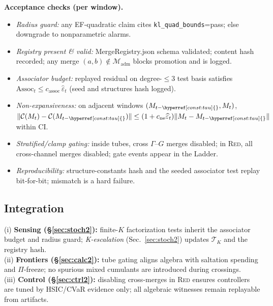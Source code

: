 \documentclass[10pt]{article}
\newcommand{\constref}[1]{\hyperref[const:#1]{\ensuremath{\csname constsym#1\endcsname}}}
\begin{document}
\begin{mdframed}
\textbf{Acceptance checks (per window).}
\begin{itemize}[leftmargin=*]
\item \emph{Radius guard:} any EF-quadratic claim cites \texttt{kl\_quad\_bounds}=\textsf{pass}; else downgrade to nonparametric alarms.
\item \emph{Registry present \& valid:} \textsf{MergeRegistry.json} schema validated; content hash recorded; any merge $(a,b)\notin\mathcal M_{\mathrm{adm}}$ blocks promotion and is logged.
\item \emph{Associator budget:} replayed residual on degree-$\le3$ test basis satisfies
$\mathrm{Assoc}_t \le c_{\mathrm{assoc}}\,\widehat\varepsilon_t$ (seed and structures hash logged).
\item \emph{Non-expansiveness:} on adjacent windows $(M_{t-\constref{tau}},M_t)$,
$\|\mathcal C(M_t)-\mathcal C(M_{t-\constref{tau}})\|\le (1+c_{\mathrm{ne}}\widehat\varepsilon_t)\|M_t-M_{t-\constref{tau}}\|$ within CI.
\item \emph{Stratified/clamp gating:} inside tubes, cross $\Gamma$–$G$ merges disabled; in \textsc{Red}, all cross-channel merges disabled; gate events appear in the Ladder.
\item \emph{Reproducibility:} structure-constants hash and the seeded associator test replay bit-for-bit; mismatch is a hard failure.
\end{itemize}
\end{mdframed}

\subsection*{Integration}
\noindent
(i) \textbf{Sensing (\S\ref{sec:stoch2}):} finite-$K$ factorization tests inherit the associator budget and radius guard; \emph{K-escalation} (Sec.~\ref{sec:stoch2}) updates $\mathcal T_K$ and the registry hash.\\
(ii) \textbf{Frontiers (\S\ref{sec:calc2}):} tube gating aligns algebra with saltation spending and $\Pi$-freeze; no spurious mixed cumulants are introduced during crossings.\\
(iii) \textbf{Control (\S\ref{sec:ctrl2}):} disabling cross-merges in \textsc{Red} ensures controllers are tuned by HSIC/CVaR evidence only; all algebraic witnesses remain replayable from artifacts.
\end{document}
